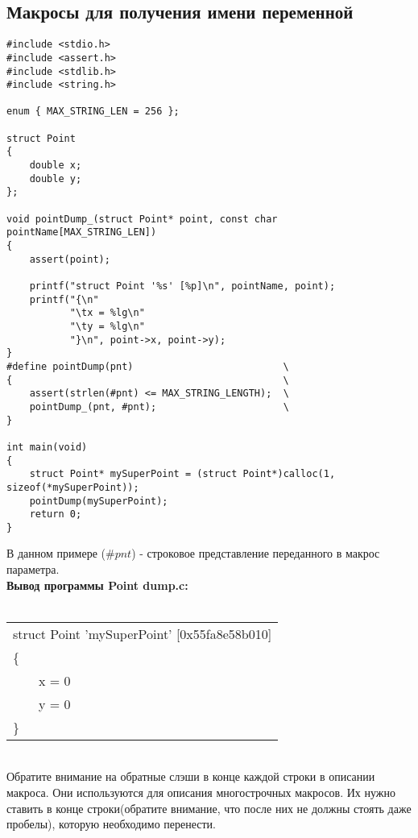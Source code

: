 \documentclass[a4paper]{article}
\begin{document}
	\subsection{Макросы для получения имени переменной}
	\begin{lstlisting}[caption={Получение имени переменной макросов}]
#include <stdio.h>
#include <assert.h>
#include <stdlib.h>
#include <string.h>

enum { MAX_STRING_LEN = 256 };

struct Point
{
    double x;
    double y;
};

void pointDump_(struct Point* point, const char pointName[MAX_STRING_LEN])
{
    assert(point);

    printf("struct Point '%s' [%p]\n", pointName, point);
    printf("{\n"
           "\tx = %lg\n"
           "\ty = %lg\n"
           "}\n", point->x, point->y);
}
#define pointDump(pnt)                          \
{                                               \
    assert(strlen(#pnt) <= MAX_STRING_LENGTH);  \
    pointDump_(pnt, #pnt);                      \
}

int main(void)
{
    struct Point* mySuperPoint = (struct Point*)calloc(1, sizeof(*mySuperPoint));
    pointDump(mySuperPoint);
    return 0;
}
	\end{lstlisting} 
	В данном примере ($\#pnt$) - строковое представление переданного в макрос параметра. \\
	\textbf{Вывод программы Point dump.c:} \\ \\
\begin{tabular}{|l}
struct Point 'mySuperPoint' [0x55fa8e58b010] \\
\{ \\
\ \ \ \ x = 0\\
\ \ \ \ y = 0\\
\}
\end{tabular} \\
Обратите внимание на обратные слэши в конце каждой строки в описании макроса. Они используются для описания многострочных макросов. Их нужно ставить в конце строки(обратите внимание, что после них не должны стоять даже пробелы), которую необходимо перенести.

\newpage
\end{document}
